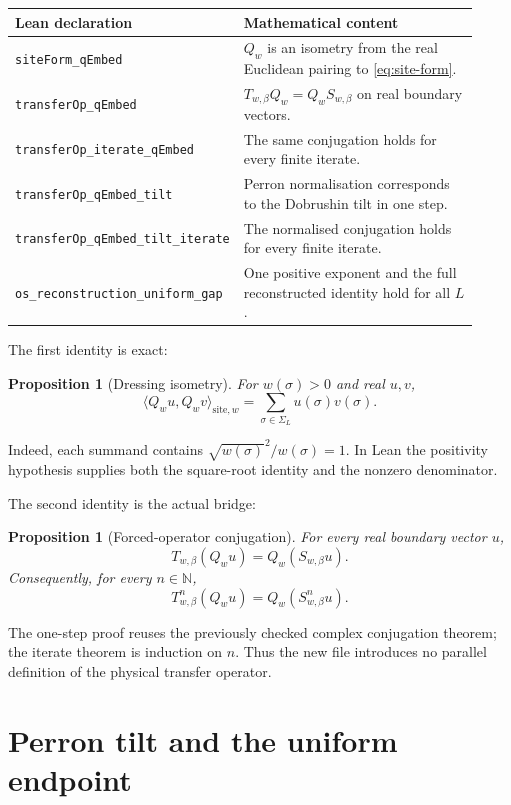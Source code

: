 \documentclass[11pt]{article}
\newtheorem{proposition}[theorem]{Proposition}
\newcommand{\N}{\mathbb N}
\newcommand{\SigmaL}{\Sigma_L}
\begin{document}
\begin{center}
\small
\begin{tabular}{@{}P{0.34\linewidth}P{0.58\linewidth}@{}}
\toprule
Lean declaration & Mathematical content \\
\midrule
\texttt{siteForm\_qEmbed} & $Q_w$ is an isometry from the real Euclidean pairing to \eqref{eq:site-form}. \\
\texttt{transferOp\_qEmbed} & $T_{w,\beta}Q_w=Q_wS_{w,\beta}$ on real boundary vectors. \\
\texttt{transferOp\_iterate\_qEmbed} & The same conjugation holds for every finite iterate. \\
\texttt{transferOp\_qEmbed\_tilt} & Perron normalisation corresponds to the Dobrushin tilt in one step. \\
\texttt{transferOp\_qEmbed\_tilt\_iterate} & The normalised conjugation holds for every finite iterate. \\
\texttt{os\_reconstruction\_uniform\_gap} & One positive exponent and the full reconstructed identity hold for all $L$. \\
\bottomrule
\end{tabular}
\end{center}

The first identity is exact:
\begin{proposition}[Dressing isometry]
For $w(\sigma)>0$ and real $u,v$,
\[
  \langle Q_wu,Q_wv\rangle_{\mathrm{site},w}
   =\sum_{\sigma\in\SigmaL}u(\sigma)v(\sigma).
\]
\end{proposition}
Indeed, each summand contains
$\sqrt{w(\sigma)}^2/w(\sigma)=1$.  In Lean the positivity hypothesis supplies
both the square-root identity and the nonzero denominator.

The second identity is the actual bridge:
\begin{proposition}[Forced-operator conjugation]
For every real boundary vector $u$,
\begin{equation}\label{eq:conjugation}
  T_{w,\beta}(Q_wu)=Q_w(S_{w,\beta}u).
\end{equation}
Consequently, for every $n\in\N$,
\[
  T_{w,\beta}^{n}(Q_wu)=Q_w(S_{w,\beta}^{n}u).
\]
\end{proposition}
The one-step proof reuses the previously checked complex conjugation theorem;
the iterate theorem is induction on $n$.  Thus the new file introduces no
parallel definition of the physical transfer operator.

\section{Perron tilt and the uniform endpoint}
\end{document}
